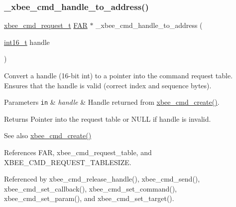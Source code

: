 \subsubsection{\texorpdfstring{\+\_\+xbee\+\_\+cmd\+\_\+handle\+\_\+to\+\_\+address()}{\_xbee\_cmd\_handle\_to\_address()}}
{\footnotesize\ttfamily \hyperlink{structxbee__cmd__request__t}{xbee\+\_\+cmd\+\_\+request\+\_\+t} \hyperlink{group__hal_gaef060b3456fdcc093a7210a762d5f2ed}{F\+AR} $\ast$ \+\_\+xbee\+\_\+cmd\+\_\+handle\+\_\+to\+\_\+address (\begin{DoxyParamCaption}\item[{\hyperlink{group__hal__dos_ga2140805d08462d474b82ddc8d1c2f3e6}{int16\+\_\+t}}]{handle }\end{DoxyParamCaption})}

Convert a handle (16-\/bit int) to a pointer into the command request table. Ensures that the handle is valid (correct index and sequence bytes).


\begin{DoxyParams}[1]{Parameters}
\mbox{\tt in}  & {\em handle} & Handle returned from \hyperlink{group__xbee__atcmd_gab73aaf873be6f9e515dcd65748a7f21c}{xbee\+\_\+cmd\+\_\+create()}.\\
\hline
\end{DoxyParams}
\begin{DoxyReturn}{Returns}
Pointer into the request table or N\+U\+LL if handle is invalid.
\end{DoxyReturn}
\begin{DoxySeeAlso}{See also}
\hyperlink{group__xbee__atcmd_gab73aaf873be6f9e515dcd65748a7f21c}{xbee\+\_\+cmd\+\_\+create()} 
\end{DoxySeeAlso}


References F\+AR, xbee\+\_\+cmd\+\_\+request\+\_\+table, and X\+B\+E\+E\+\_\+\+C\+M\+D\+\_\+\+R\+E\+Q\+U\+E\+S\+T\+\_\+\+T\+A\+B\+L\+E\+S\+I\+ZE.



Referenced by xbee\+\_\+cmd\+\_\+release\+\_\+handle(), xbee\+\_\+cmd\+\_\+send(), xbee\+\_\+cmd\+\_\+set\+\_\+callback(), xbee\+\_\+cmd\+\_\+set\+\_\+command(), xbee\+\_\+cmd\+\_\+set\+\_\+param(), and xbee\+\_\+cmd\+\_\+set\+\_\+target().

\mbox{\label{group__xbee__atcmd_ga4931ffe3ba31eaf16eee72ac0a95015b}} 
